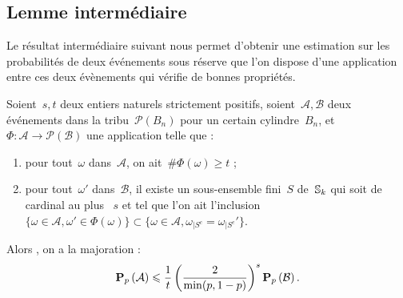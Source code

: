 	\subsection{Lemme intermédiaire}
		Le résultat intermédiaire suivant nous permet d'obtenir une estimation sur les probabilités de deux événements sous réserve que l'on dispose d'une application entre ces deux évènements qui vérifie de bonnes propriétés.
		\begin{lem}\label{lem:interGluant}
			Soient~$s,t$ deux entiers naturels strictement positifs, soient~$\mathcal{A},\mathcal{B}$ deux événements dans la tribu~$\mathcal{P}(B_n)$ pour un certain cylindre~$B_n$, et~$\Phi : \mathcal{A} \rightarrow \mathcal{P}(\mathcal{B})$ une application telle que :
			\begin{enumerate}
				\item pour tout~$\omega$ dans~$\mathcal{A}$, on ait~$\#\Phi(\omega)\geq t$ ; \label{item:interGluant:a}
				\item pour tout~$\omega'$ dans~$\mathcal{B}$, il existe un sous-ensemble fini~$S$ de~$\mathbb{S}_k$ qui soit de cardinal au plus~ $s$ et tel que l'on ait l'inclusion~$\{\omega\in\mathcal{A},\omega'\in\Phi(\omega)\} \subset \{\omega\in\mathcal{A},\omega_{|S^c}=\omega_{|S^c}'\}$. \label{item:interGluant:b}
			\end{enumerate}
			Alors , on a la majoration :
			\[
				\bm{\mathrm{P}}_{p}\left(\mathcal{A}\right) \leqslant \frac{1}{t}
					\left(\frac{2}{\min(p,1-p)}\right)^s
					\bm{\mathrm{P}}_{p}\left(\mathcal{B}\right).
			\]
		\end{lem}
